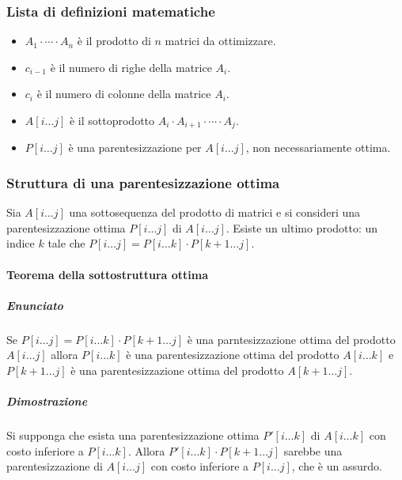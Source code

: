 \subsubsection{Lista di definizioni matematiche}
\begin{itemize}
	\item $A_1\cdot\cdots\cdot A_n$ \`e il prodotto di $n$ matrici da ottimizzare.
	\item $c_{i-1}$ \`e il numero di righe della matrice $A_i$.
	\item $c_i$ \`e il numero di colonne della matrice $A_i$.
	\item $A[i\dots j]$ \`e il sottoprodotto $A_i\cdot A_{i+1}\cdot\cdots\cdot A_j$.
	\item $P[i\dots j]$ \`e una parentesizzazione per $A[i\dots j]$, non necessariamente ottima. 
\end{itemize}
\subsubsection{Struttura di una parentesizzazione ottima}
Sia $A[i\dots j]$ una sottosequenza del prodotto di matrici e si consideri una parentesizzazione ottima $P[i\dots j]$ di $A[i\dots j]$. Esiste un ultimo
prodotto: un indice $k$ tale che $P[i\dots j] = P[i\dots k]\cdot P[k+1\dots j]$.
\paragraph{Teorema della sottostruttura ottima}
\subparagraph{Enunciato}
Se $P[i\dots j]=P[i\dots k]\cdot P[k+1\dots j]$ \`e una parntesizzazione ottima del prodotto $A[i\dots j]$ allora $P[i\dots k]$ \`e una parentesizzazione
ottima del prodotto $A[i\dots k]$ e $P[k+1\dots j]$ \`e una parentesizzazione ottima del prodotto $A[k+1\dots j]$. 
\subparagraph{Dimostrazione}
Si supponga che esista una parentesizzazione ottima $P'[i\dots k]$ di $A[i\dots k]$ con costo inferiore a $P[i\dots k]$. Allora $P'[i\dots k]\cdot 
P[k+1\dots j]$ sarebbe una parentesizzazione di $A[i\dots j]$ con costo inferiore a $P[i\dots j]$, che \`e un assurdo. 
